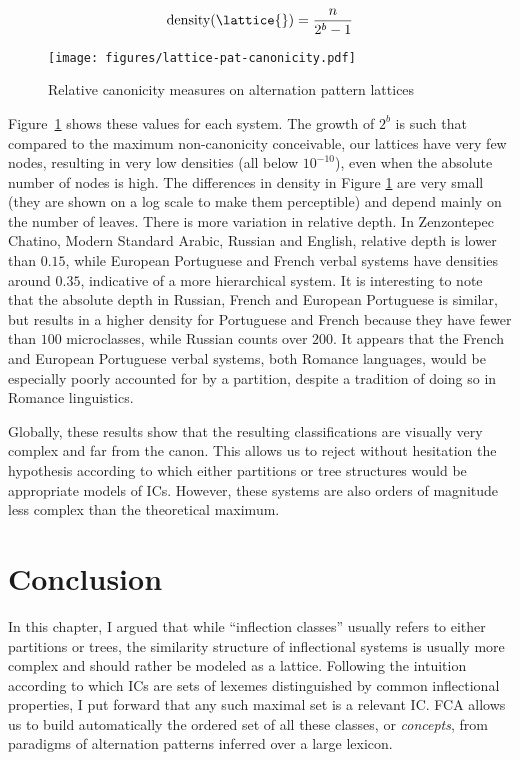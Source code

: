 \documentclass[output=paper]{langscibook}
\begin{document}
    \begin{equation*}
    \text{density}(\lattice{}) = \frac{n}{2^{b}-1}
    \end{equation*}

    \begin{figure}
        \centering
        \texttt{[image: figures/lattice-pat-canonicity.pdf]}
        \caption{Relative canonicity measures on alternation pattern lattices}
        \label{fig:beniamine:compRelcanon}
    \end{figure}

    Figure~\ref{fig:beniamine:compRelcanon} shows these values for each system. The growth of $2^{b}$ is such that compared to the maximum non-canonicity conceivable, our lattices have very few nodes, resulting in very low densities (all below $10^{-10}$), even when the absolute number of nodes is high. The differences in density in Figure \ref{fig:beniamine:compRelcanon} are very small (they are shown on a log scale to make them perceptible) and depend mainly on the number of leaves. There is more variation in relative depth. In Zenzontepec Chatino, Modern Standard Arabic, Russian and English, relative depth is lower than $0.15$, while European Portuguese and French verbal systems have densities around $0.35$, indicative of a more hierarchical system. It is interesting to note that the absolute depth in Russian, French and European Portuguese is similar, but results in a higher density for Portuguese and French because they have fewer than $100$ microclasses, while Russian counts over $200$. It appears that the French and European Portuguese verbal systems, both Romance languages, would be especially poorly accounted for by a partition, despite a tradition of doing so in Romance linguistics.

    Globally, these results show that the resulting classifications are visually very complex and far from the canon. This allows us to reject without hesitation the hypothesis according to which either partitions or tree structures would be appropriate models of ICs. However, these systems are also orders of magnitude less complex than the theoretical maximum.


    \section{Conclusion}
    \label{Conclusion:beniamine}

    In this chapter, I argued that while ``inflection classes'' usually refers to either partitions or trees, the similarity structure of inflectional systems is usually more complex and should rather be modeled as a lattice. Following the intuition according to which ICs are sets of lexemes distinguished by common inflectional properties, I put forward that any such maximal set is a relevant IC. FCA allows us to build automatically the ordered set of all these classes, or \textit{concepts}, from paradigms of alternation patterns inferred over a large lexicon.
\end{document}
